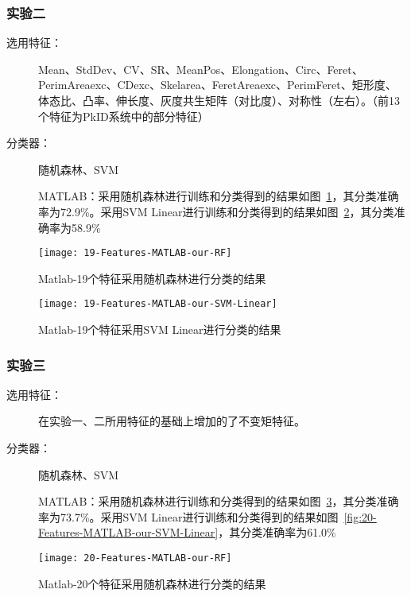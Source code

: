 \subsubsection{实验二}
\begin{description}
\item[选用特征：] Mean、StdDev、CV、SR、MeanPos、Elongation、Circ、Feret、PerimAreaexc、CDexc、Skelarea、FeretAreaexc、PerimFeret、矩形度、体态比、凸率、伸长度、灰度共生矩阵（对比度）、对称性（左右）。（前13个特征为PkID系统中的部分特征）
\item[分类器：] 随机森林、SVM

MATLAB：采用随机森林进行训练和分类得到的结果如图~\ref{fig:19-Features-MATLAB-our-RF}，其分类准确率为72.9\%。采用SVM Linear进行训练和分类得到的结果如图~\ref{fig:19-Features-MATLAB-our-SVM-Linear}，其分类准确率为58.9\%
\end{description}
\begin{figure}[!ht]
\centering
\texttt{[image: 19-Features-MATLAB-our-RF]}
\caption{Matlab-19个特征采用随机森林进行分类的结果}
\label{fig:19-Features-MATLAB-our-RF}
\end{figure}

\begin{figure}[!ht]
\centering
\texttt{[image: 19-Features-MATLAB-our-SVM-Linear]}
\caption{Matlab-19个特征采用SVM Linear进行分类的结果}
\label{fig:19-Features-MATLAB-our-SVM-Linear}
\end{figure}

\subsubsection{实验三}
\label{shiyan3}
\begin{description}
\item[选用特征：] 在实验一、二所用特征的基础上增加的了不变矩特征。
\item[分类器：] 随机森林、SVM

MATLAB：采用随机森林进行训练和分类得到的结果如图~\ref{fig:20-Features-MATLAB-our-RF}，其分类准确率为73.7\%。采用SVM Linear进行训练和分类得到的结果如图~\ref{fig:20-Features-MATLAB-our-SVM-Linear}，其分类准确率为61.0\%
\end{description}
\begin{figure}[!ht]
\centering
\texttt{[image: 20-Features-MATLAB-our-RF]}
\caption{Matlab-20个特征采用随机森林进行分类的结果}
\label{fig:20-Features-MATLAB-our-RF}
\end{figure}

